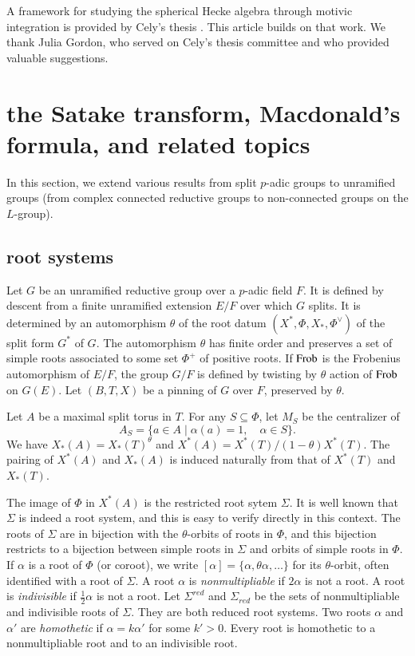 A framework for studying the spherical Hecke algebra through motivic integration is provided by Cely's thesis \cite{cely}.
This article builds on that work.  We thank Julia Gordon, who served on Cely's thesis committee and who provided valuable suggestions.



\section{the Satake transform, Macdonald's formula, and related topics}

In this section, we extend various results from split $p$-adic groups to unramified groups
(from
complex connected reductive groups to non-connected groups on the $L$-group).

\subsection{root systems}

Let $G$ be an unramified reductive group over a $p$-adic field $F$.  It is defined by
descent from a finite unramified extension $E/F$ over which $G$ splits.  It is determined by an automorphism
$\theta$ of the root datum $(X^*,\Phi,X_*,\Phi^\vee)$ of the split form $G^*$ of $G$.     
The automorphism $\theta$
has finite order and preserves a set of simple roots associated to some set $\Phi^+$ of positive roots.
If ${\operatorname{Frob}}$ is the Frobenius automorphism of $E/F$, the group $G/F$ is defined by twisting by $\theta$
action of ${\operatorname{Frob}}$ on $G(E)$.
Let $(B,T,X)$ be a pinning of $G$ over $F$, preserved by $\theta$.

Let $A$ be a maximal split torus in $T$.
For any $S\subseteq \Phi$,
let $M_S$
be the centralizer of 
\[
A_S = \{a\in A\mid \alpha(a)=1,\quad \alpha\in S\}.
\]
We have
$X_*(A) = X_*(T)^\theta$ and $X^*(A) = X^*(T)/(1-\theta)X^*(T)$.
The pairing of $X^*(A)$ and $X_*(A)$ is induced naturally from that of $X^*(T)$ and $X_*(T)$.

The image of $\Phi$ in $X^*(A)$ is the restricted root sytem $\Sigma$.  
It is well known that $\Sigma$ is indeed a root system, and this is easy to
verify directly in this context.
The roots of $\Sigma$ are in bijection with the 
$\theta$-orbits of  roots in $\Phi$, and this bijection restricts to a bijection between
simple roots in $\Sigma$ and
 orbits of simple
roots in $\Phi$.
If $\alpha$ is a root of $\Phi$ (or coroot), we write 
$[\alpha]=\{\alpha,\theta\alpha,\ldots\}$ for its
$\theta$-orbit, often identified with a root of $\Sigma$.
A root $\alpha$ is {\it nonmultipliable} if $2\alpha$ is not a root.
A root is {\it indivisible} if $\frac12\alpha$ is not a root.
Let $\Sigma^{red}$ and $\Sigma_{red}$ be the sets of nonmultipliable and indivisible roots of $\Sigma$.
 They are both reduced root systems.
Two roots $\alpha$ and $\alpha'$ are {\it homothetic} if $\alpha = k \alpha'$ for some $k'>0$.
Every root is homothetic to a nonmultipliable root and to an indivisible root.


